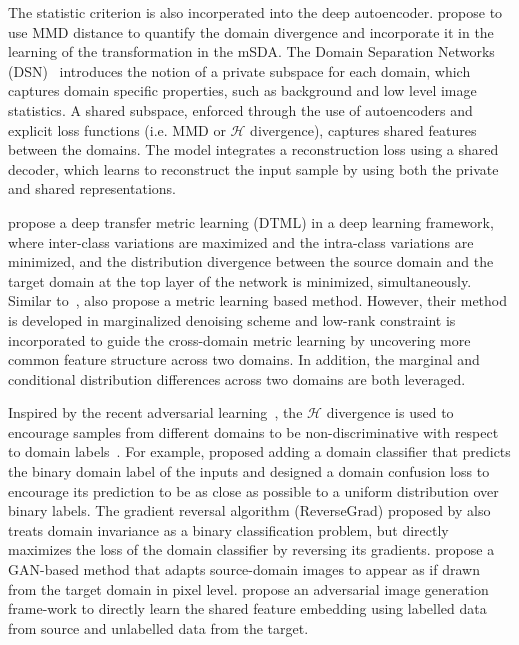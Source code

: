 \documentclass[prodmode]{acmsmall}  %
\begin{document}
The statistic criterion is also incorperated into the deep autoencoder.  propose to use MMD distance to quantify the domain divergence and incorporate it in the learning of the transformation in the mSDA. The Domain Separation Networks (DSN)~\cite{Bousmalis2016} introduces the notion of a private subspace for each domain, which captures domain specific properties, such as background and low level image statistics. A shared subspace, enforced through the use of autoencoders and explicit loss functions (i.e. MMD or $\mathcal{H}$ divergence), captures shared features between the domains. The model integrates a reconstruction loss using a shared decoder, which learns to reconstruct the input sample by using both the private and shared representations.

 propose a deep transfer metric learning (DTML) in a deep learning framework, where inter-class variations are maximized and the intra-class variations are minimized, and the distribution divergence between the source domain and the target domain at the top layer of the network is minimized, simultaneously. Similar to~\cite{Hu2015a},  also propose a metric learning based method. However, their method is developed in marginalized denoising scheme and low-rank constraint is incorporated to guide the cross-domain metric learning by uncovering more common feature structure across two domains. In addition, the marginal and conditional distribution differences across two domains are both leveraged.

Inspired by the recent adversarial learning~\cite{Goodfellow2014}, the $\mathcal{H}$ divergence is used to encourage samples from different domains to be non-discriminative with respect to domain labels~\cite{Tzeng2015,Ganin2015,Ganin2016,Tzeng2017,Bousmalis2017}. For example,  proposed adding a domain classifier that predicts the binary domain label of the inputs and designed a domain confusion loss to encourage its prediction to be as close as possible to a uniform distribution over binary labels. The gradient reversal algorithm (ReverseGrad) proposed by  also treats domain invariance as a binary classification problem, but directly maximizes the loss of the domain classifier by reversing its gradients.  propose a GAN-based method that adapts source-domain images to appear as if drawn from the target domain in pixel level.  propose an adversarial image generation frame-work to directly learn the shared feature embedding using labelled data from source and unlabelled data from the target.
\end{document}
